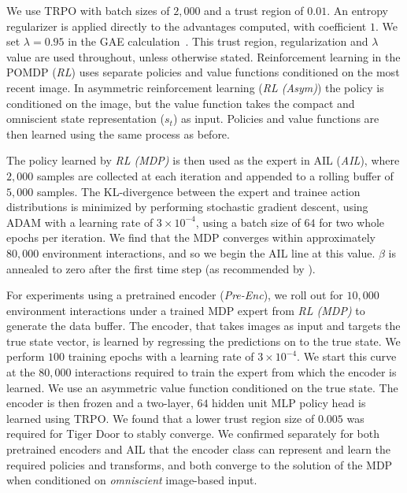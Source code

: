 We use TRPO with batch sizes of $2,000$ and a trust region of $0.01$.  An entropy regularizer is applied directly to the advantages computed, with coefficient $1$.  We set $\lambda=0.95$ in the GAE calculation~\citep{schulman2015high}.  This trust region, regularization and $\lambda$ value are used throughout, unless otherwise stated.  Reinforcement learning in the POMDP (\emph{RL}) uses separate policies and value functions conditioned on the most recent image.  In asymmetric reinforcement learning (\emph{RL (Asym)}) the policy is conditioned on the image, but the value function takes the compact and omniscient state representation ($s_t$) as input.  Policies and value functions are then learned using the same process as before.

The policy learned by \emph{RL (MDP)} is then used as the expert in AIL (\emph{AIL}), where $2,000$ samples are collected at each iteration and appended to a rolling buffer of $5,000$ samples.  The KL-divergence between the expert and trainee action distributions is minimized by performing stochastic gradient descent, using ADAM with a learning rate of $3\times 10^{-4}$, using a batch size of $64$ for two whole epochs per iteration.  We find that the MDP converges within approximately $80,000$ environment interactions, and so we begin the AIL line at this value.  $\beta$ is annealed to zero after the first time step (as recommended by \citet{Ross2011}).  

For experiments using a pretrained encoder (\emph{Pre-Enc}), we roll out for $10,000$ environment interactions under a trained MDP expert from \emph{RL (MDP)} to generate the data buffer.  The encoder, that takes images as input and targets the true state vector, is learned by regressing the predictions on to the true state.  We perform $100$ training epochs with a learning rate of $3 \times 10^{-4}$.  We start this curve at the $80,000$ interactions required to train the expert from which the encoder is learned.  We use an asymmetric value function conditioned on the true state.  The encoder is then frozen and a two-layer, $64$ hidden unit MLP policy head is learned using TRPO.  We found that a lower trust region size of $0.005$ was required for Tiger Door to stably converge.  We confirmed separately for both pretrained encoders and AIL that the encoder class can represent and learn the required policies and transforms, and both converge to the solution of the MDP when conditioned on \emph{omniscient} image-based input.  

